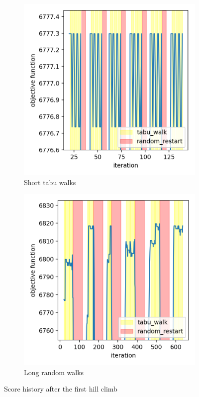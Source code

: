 \documentclass[sigconf, fleqn, prologue, dvipsnames]{acmart}
\begin{document}
\begin{figure}
	\centering
	\begin{subfigure}{0.2\textwidth}
		\centering
		\includegraphics[scale=0.35]{graphics/tabu_small_2ts.png}
		\caption{Short tabu walks}
		\label{fig:methods:fine_tuning:too_short_t}
	\end{subfigure}
	\begin{subfigure}{0.2\textwidth}
		\centering
		\includegraphics[scale=0.35]{graphics/tabu_small_2tr.png}
		\caption{Long random walks}
		\label{fig:methods:fine_tuning:too_long_r}
	\end{subfigure}
	\caption{Score history after the first hill climb}
	\label{fig:methods:fine_tuning}
\end{figure}
\FloatBarrier
\end{document}

